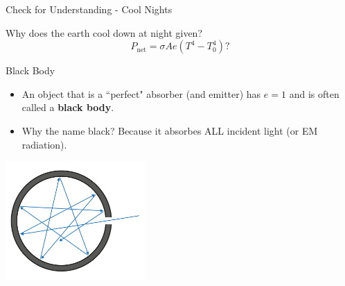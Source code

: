 \documentclass{beamer}
\begin{document}
\begin{frame}{Check for Understanding - Cool Nights}
\begin{center}
   Why does the earth cool down at night given?
   \begin{equation*}
      P_\text{net} = \sigma A e \left(T^4-T_0^4\right)?
   \end{equation*}
\end{center}
\end{frame}

\begin{frame}{Black Body}
\begin{itemize}
   \item An object that is a ``perfect" absorber (and emitter) has $e=1$ and is often called a {\bf black body}.
   \item Why the name black? Because it absorbes ALL incident light (or EM radiation).
\end{itemize}
\begin{center}
   \includegraphics[width=0.40\textwidth]{figures/black_body.png}
\end{center}
\end{frame}
\end{document}
